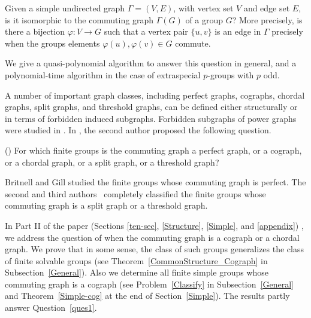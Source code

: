 \documentclass{elsarticle}
\begin{document}
\begin{ques}\label{ques0}
  Given a simple undirected graph $\Gamma =(V,E)$, with vertex set $V$
  and edge set $E$, is it isomorphic to the commuting graph
  $\Gamma(G)$ of a group $G$? More precisely, is there a bijection
  $\varphi:V\to G$ such that a vertex pair $\{u,v\}$ is an edge in
  $\Gamma$ precisely when the groups elements
  $\varphi(u),\varphi(v)\in G$ commute.
\end{ques}

We give a quasi-polynomial algorithm to answer this question in
general, and a polynomial-time algorithm in the case of extraspecial
$p$-groups with $p$ odd.

A number of important graph classes, including perfect graphs,
cographs, chordal graphs, split graphs, and threshold graphs, can be
defined either structurally or in terms of forbidden induced
subgraphs. Forbidden subgraphs of power graphs were studied in
\cite{MCam}.  In \cite{GGsurvey}, the second author proposed the following
question.


\begin{ques}\label{ques1}{\rm (\cite[Question 14]{GGsurvey})}
For which finite groups is the commuting graph a perfect graph, or a
cograph, or a chordal graph, or a split graph, or a threshold graph?
\end{ques}

Britnell and Gill \cite{Br17} studied the finite groups whose commuting graph is perfect.  The second and third authors~\cite{MaCam} completely classified the finite groups whose commuting graph is a split graph or a threshold graph.

In Part II of the paper (Sections \ref{ten-sec}, \ref{Structure},
\ref{Simple}, and \ref{appendix}) , we address the question of when
the commuting graph is a cograph or a chordal graph. We prove that in
some sense, the class of such groups generalizes the class of finite
solvable groups (see Theorem~\ref{CommonStructure_Cograph} in
Subsection~\ref{General}). Also we determine all finite simple groups
whose commuting graph is a cograph (see Problem~\ref{Classify} in
Subsection~\ref{General} and Theorem~\ref{Simple-cog} at the end of
Section~\ref{Simple}). The results partly answer Question~\ref{ques1}.
\end{document}
